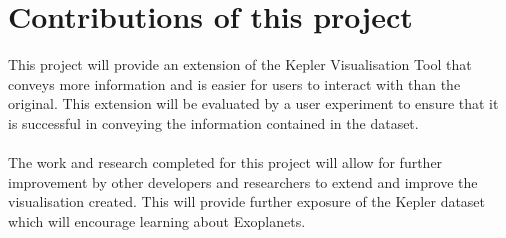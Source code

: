 \section{Contributions of this project}
This project will provide an extension of the Kepler Visualisation Tool \cite{kepler_github} that conveys more information and is easier for users to interact with than the original. This extension will be evaluated by a user experiment to ensure that it is successful in conveying the information contained in the dataset.
\\\\
The work and research completed for this project will allow for further improvement by other developers and researchers to extend and improve the visualisation created. This will provide further exposure of the Kepler dataset which will encourage learning about Exoplanets.
